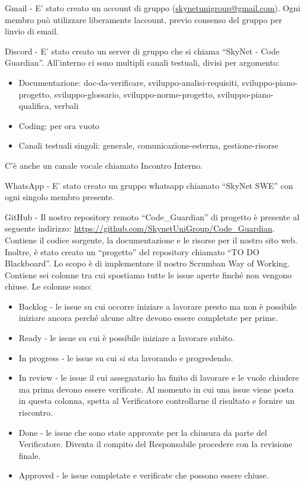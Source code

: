 \documentclass[12pt, a4paper]{article}
\begin{document}
 {Gmail} - E' stato creato un account di gruppo
(\href{mailto:skynetunigroup@gmail.com}{ {skynetunigroup@gmail.com}}).
Ogni membro può utilizzare liberamente l\textquotesingle account, previo
consenso del gruppo per l\textquotesingle invio di email.

 {Discord} - E' stato creato un server di gruppo che si chiama
``SkyNet - Code Guardian''. All'interno ci sono multipli canali
testuali, divisi per argomento:

\begin{itemize}
\item
  Documentazione: doc-da-verificare, sviluppo-analisi-requisiti,
  sviluppo-piano-progetto, sviluppo-glossario, sviluppo-norme-progetto,
  sviluppo-piano-qualifica, verbali
\item
  Coding: per ora vuoto
\item
  Canali testuali singoli: generale, comunicazione-esterna,
  gestione-risorse
\end{itemize}

C'è anche un canale vocale chiamato Incontro Interno.

 {WhatsApp} - E' stato creato un gruppo whatsapp chiamato ``SkyNet
SWE'' con ogni singolo membro presente.

 {GitHub} - Il nostro repository remoto ``Code\_Guardian'' di progetto
è presente al seguente indirizzo:
\href{https://github.com/SkynetUniGroup/Code_Guardian}{ {https://github.com/SkynetUniGroup/Code\_Guardian}}.
Contiene il codice sorgente, la documentazione e le risorse per il
nostro sito web.\\
Inoltre, è stato creato un ``progetto'' del repository chiamato ``TO DO
Blackboard''. Lo scopo è di implementare il nostro Scrumban Way of
Working. Contiene sei colonne tra cui spostiamo tutte le issue aperte
finché non vengono chiuse. Le colonne sono:

\begin{itemize}
\item
  Backlog - le issue su cui occorre iniziare a lavorare presto ma non è
  possibile iniziare ancora perché alcune altre devono essere completate
  per prime.
\item
  Ready - le issue su cui è possibile iniziare a lavorare subito.
\item
  In progress - le issue su cui si sta lavorando e progredendo.
\item
  In review - le issue il cui assegnatario ha finito di lavorare e le
  vuole chiudere ma prima devono essere verificate. Al momento in cui
  una issue viene posta in questa colonna, spetta al Verificatore
  controllarne il risultato e fornire un riscontro.
\item
  Done - le issue che sono state approvate per la chiusura da parte del
  Verificatore. Diventa il compito del Responsabile procedere con la
  revisione finale.
\item
  Approved - le issue completate e verificate che possono essere chiuse.
\end{itemize}
\end{document}
